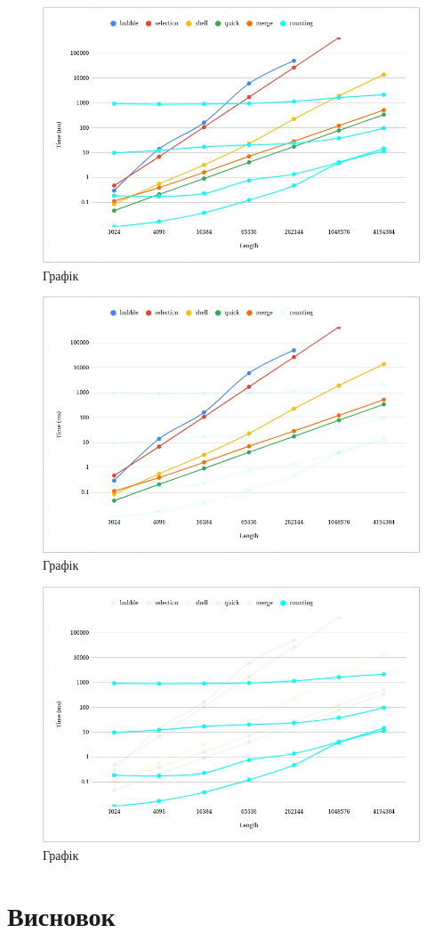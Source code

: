 \documentclass{article}
\begin{document}
\begin{normalsize}
		\begin{figure}[H]
			\centering
			\includegraphics[scale=0.5]{1}	
			\caption{Графік}
		\end{figure}
	
		\begin{figure}[H]
			\centering
			\includegraphics[scale=0.5]{2}	
			\caption{Графік}
		\end{figure}
		
		\begin{figure}[H]
			\centering
			\includegraphics[scale=0.5]{3}	
			\caption{Графік}
		\end{figure}
		
		\section*{Висновок}
		
		
	\end{normalsize}
\end{document}

